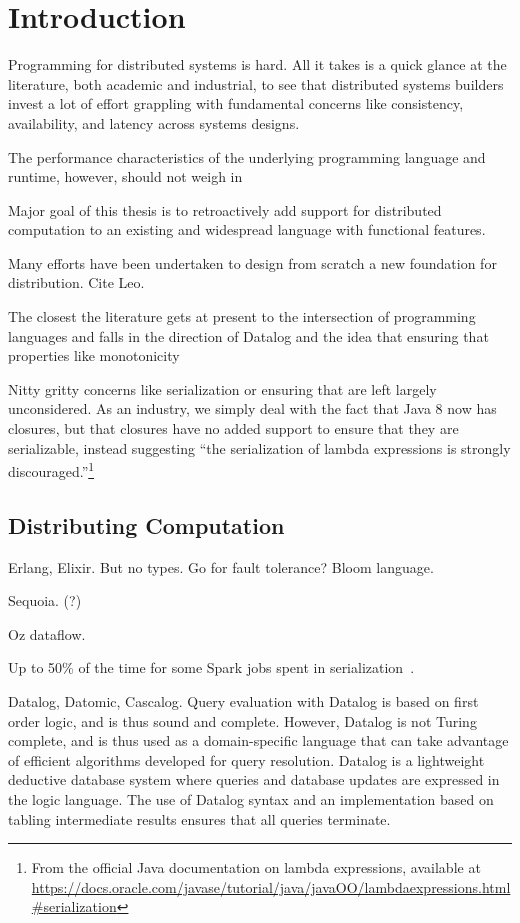 \chapter{Introduction}


Programming for distributed systems is hard. All it takes is a quick glance at
the literature, both academic and industrial, to see that distributed systems
builders invest a lot of effort grappling with fundamental concerns like
consistency, availability, and latency across systems designs.

The performance characteristics of the underlying programming language and
runtime, however, should not weigh in

Major goal of this thesis is to retroactively add support for distributed
computation to an existing and widespread language with functional features.

Many efforts have been undertaken to design from scratch a new foundation for
distribution. Cite Leo.


The closest the literature gets at present to the intersection of programming
languages and falls in the direction of Datalog and the idea that ensuring that
properties like monotonicity

Nitty gritty concerns like serialization or ensuring that are left largely
unconsidered. As an industry, we simply deal with the fact that Java 8 now has
closures, but that closures have no added support to ensure that they are
serializable, instead suggesting ``the serialization of lambda expressions is
strongly discouraged.''\footnote{From the official Java documentation on lambda
expressions, available at
\url{https://docs.oracle.com/javase/tutorial/java/javaOO/lambdaexpressions.html\#serialization}}

\section{Distributing Computation}

Erlang, Elixir. But no types. Go for fault tolerance? Bloom language.

Sequoia. (?)

Oz dataflow.

Up to 50\% of the time for some Spark jobs spent in
serialization~\cite{OusterhoutSerialization}.

Datalog, Datomic, Cascalog. Query evaluation with Datalog is based on first
order logic, and is thus sound and complete. However, Datalog is not Turing
complete, and is thus used as a domain-specific language that can take advantage
of efficient algorithms developed for query resolution. Datalog is a lightweight
deductive database system where queries and database updates are expressed in
the logic language. The use of Datalog syntax and an implementation based on
tabling intermediate results ensures that all queries terminate.

